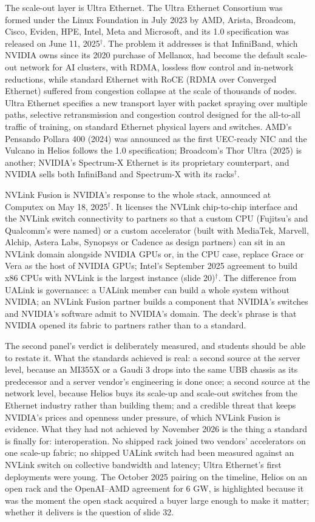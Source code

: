 \documentclass[11pt,letterpaper]{article}
\begin{document}
The scale-out layer is Ultra Ethernet. The Ultra Ethernet Consortium was formed under the Linux Foundation in July 2023 by AMD, Arista, Broadcom, Cisco, Eviden, HPE, Intel, Meta and Microsoft, and its 1.0 specification was released on June 11, 2025$^\dagger$. The problem it addresses is that InfiniBand, which NVIDIA owns since its 2020 purchase of Mellanox, had become the default scale-out network for AI clusters, with RDMA, lossless flow control and in-network reductions, while standard Ethernet with RoCE (RDMA over Converged Ethernet) suffered from congestion collapse at the scale of thousands of nodes. Ultra Ethernet specifies a new transport layer with packet spraying over multiple paths, selective retransmission and congestion control designed for the all-to-all traffic of training, on standard Ethernet physical layers and switches. AMD's Pensando Pollara 400 (2024) was announced as the first UEC-ready NIC and the Vulcano in Helios follows the 1.0 specification; Broadcom's Thor Ultra (2025) is another; NVIDIA's Spectrum-X Ethernet is its proprietary counterpart, and NVIDIA sells both InfiniBand and Spectrum-X with its racks$^\dagger$.

NVLink Fusion is NVIDIA's response to the whole stack, announced at Computex on May 18, 2025$^\dagger$. It licenses the NVLink chip-to-chip interface and the NVLink switch connectivity to partners so that a custom CPU (Fujitsu's and Qualcomm's were named) or a custom accelerator (built with MediaTek, Marvell, Alchip, Astera Labs, Synopsys or Cadence as design partners) can sit in an NVLink domain alongside NVIDIA GPUs or, in the CPU case, replace Grace or Vera as the host of NVIDIA GPUs; Intel's September 2025 agreement to build x86 CPUs with NVLink is the largest instance (slide 20)$^\dagger$. The difference from UALink is governance: a UALink member can build a whole system without NVIDIA; an NVLink Fusion partner builds a component that NVIDIA's switches and NVIDIA's software admit to NVIDIA's domain. The deck's phrase is that NVIDIA opened its fabric to partners rather than to a standard.

The second panel's verdict is deliberately measured, and students should be able to restate it. What the standards achieved is real: a second source at the server level, because an MI355X or a Gaudi 3 drops into the same UBB chassis as its predecessor and a server vendor's engineering is done once; a second source at the network level, because Helios buys its scale-up and scale-out switches from the Ethernet industry rather than building them; and a credible threat that keeps NVIDIA's prices and openness under pressure, of which NVLink Fusion is evidence. What they had not achieved by November 2026 is the thing a standard is finally for: interoperation. No shipped rack joined two vendors' accelerators on one scale-up fabric; no shipped UALink switch had been measured against an NVLink switch on collective bandwidth and latency; Ultra Ethernet's first deployments were young. The October 2025 pairing on the timeline, Helios on an open rack and the OpenAI--AMD agreement for 6 GW, is highlighted because it was the moment the open stack acquired a buyer large enough to make it matter; whether it delivers is the question of slide 32.
\end{document}
